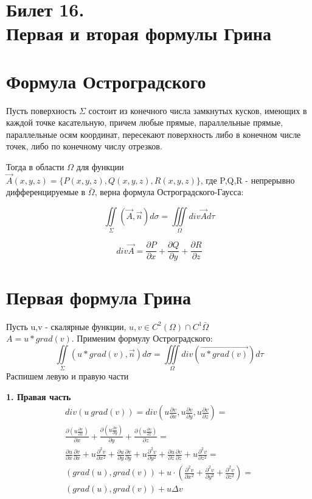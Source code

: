 \documentclass[11pt,a4paper]{article}
\title{}
\date{}
\begin{document}
\section*{Билет 16.\\ Первая и вторая формулы Грина}
\section{Формула Остроградского}
	
Пусть поверхность $\varSigma$ состоит из конечного числа замкнутых кусков, имеющих в каждой точке касательную, причем любые прямые, параллельные прямые, параллельные осям координат, пересекают поверхность либо в конечном числе точек, либо по конечному числу отрезков.

Тогда в области $\varOmega$ для функции $\vec{A}(x,y,z) = \{P(x,y,z), Q(x,y,z), R(x,y,z)\}$, где P,Q,R - непрерывно дифференцируемые в $\bar{\varOmega}$, верна формула Остроградского-Гаусса:

$$
\iint \limits_{\varSigma} (\vec{A}, \vec{n})d\sigma = \iiint \limits_{\varOmega} div \vec{A} d\tau
$$

$$
div \vec{A} = \frac{\partial P}{\partial x} + \frac{\partial Q}{\partial y} + \frac{\partial R}{\partial z}
$$

\section{Первая формула Грина}
Пусть u,v - скалярные функции, $u,v \in C^2(\varOmega) \cap C^1{\bar{\varOmega}} $\\
$A = u * grad (v)$. Применим формулу Остроградского:
$$
\iint \limits_{\varSigma} (u * grad(v), \vec{n})d\sigma = \iiint \limits_{\varOmega} div (\vec{u * grad(v)}) d\tau
$$
Распишем левую и правую части

\textbf{1. Правая часть} \\
\begin{equation}
\begin{split}
div(u\ grad(v)) = div(u\frac{\partial v}{\partial x}, u\frac{\partial v}{\partial y}, u\frac{\partial v}{\partial z}) = \\
\frac{\partial(u\frac{\partial v}{\partial x})}{\partial x} + 
\frac{\partial(u\frac{\partial v}{\partial y})}{\partial y} +
\frac{\partial(u\frac{\partial v}{\partial z})}{\partial z} = \\
\frac{\partial u}{\partial x} \frac{\partial v}{\partial x} + 
u \frac{\partial^2 v}{\partial x^2} + 
\frac{\partial u}{\partial y} \frac{\partial v}{\partial y} + 
u \frac{\partial^2 v}{\partial y^2} + 
\frac{\partial u}{\partial z} \frac{\partial v}{\partial z} + 
u \frac{\partial^2 v}{\partial z^2} = \\
(grad(u), grad(v)) + u \cdot (
\frac{\partial^2 v}{\partial x^2} +
\frac{\partial^2 v}{\partial y^2} +
\frac{\partial^2 v}{\partial z^2}
) = \\
(grad(u), grad(v)) + u \Delta v
\end{split}
\end{equation}
\end{document}
